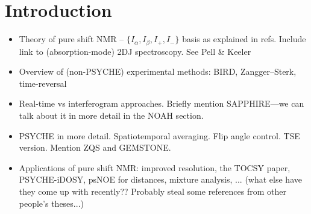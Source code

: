 \section{Introduction}
\label{sec:pureshift__introduction}

\begin{itemize}
    \item Theory of pure shift NMR -- $\{I_\alpha, I_\beta, I_+, I_-\}$ basis as explained in refs\autocite{Keeler2010,Thrippleton2005JMR,Griesinger1986JCP}.
        Include link to (absorption-mode) 2DJ spectroscopy.\autocite{Aue1976JCP} See Pell \& Keeler\autocite{Pell2007JMR}
    \item Overview of (non-PSYCHE) experimental methods: BIRD, Zangger--Sterk\autocite{Zangger1997JMR}, time-reversal
    \item Real-time vs interferogram approaches. Briefly mention SAPPHIRE\autocite{Moutzouri2017CC}---we can talk about it in more detail in the NOAH section.
    \item PSYCHE\autocite{Foroozandeh2014ACIE,Foroozandeh2018CEJ} in more detail.
        Spatiotemporal averaging.\autocite{Dumez2018PNMRS}
        Flip angle control.
        TSE version\autocite{Foroozandeh2015CC}.
        Mention ZQS\autocite{Thrippleton2003ACIE} and GEMSTONE\autocite{Kiraly2021ACIE}.
    \item Applications of pure shift NMR: improved resolution, the TOCSY paper\autocite{Foroozandeh2014JACS}, PSYCHE-iDOSY\autocite{Foroozandeh2016ACIE}, psNOE for distances\autocite{Kaltschnee2016JMR}, mixture analysis, ... (what else have they come up with recently?? Probably steal some references from other people's theses...)
\end{itemize}
